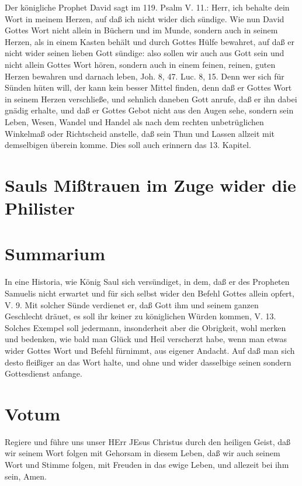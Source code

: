 Der königliche Prophet David sagt im 119. Psalm V. 11.: Herr, ich behalte dein Wort in meinem Herzen, auf daß ich nicht wider dich sündige. Wie nun David Gottes Wort nicht allein in Büchern und im Munde, sondern auch in seinem Herzen, als in einem Kasten behält und durch Gottes Hülfe bewahret, auf daß er nicht wider seinen lieben Gott sündige: also sollen wir auch aus Gott sein und nicht allein Gottes Wort hören, sondern auch in einem feinen, reinen, guten Herzen bewahren und darnach leben, Joh. 8, 47. Luc. 8, 15. Denn wer sich für Sünden hüten will, der kann kein besser Mittel finden, denn daß er Gottes Wort in seinem Herzen verschließe, und sehnlich daneben Gott anrufe, daß er ihn dabei gnädig erhalte, und daß er Gottes Gebot nicht aus den Augen sehe, sondern sein Leben, Wesen, Wandel und Handel als nach dem rechten unbetrüglichen Winkelmaß oder Richtscheid anstelle, daß sein Thun und Lassen allzeit mit demselbigen überein komme. Dies soll auch erinnern das 13. Kapitel.

\section{Sauls Mißtrauen im Zuge wider die Philister}

\section{Summarium}

In eine Historia, wie König Saul sich versündiget, in dem, daß er des Propheten Samuelis nicht erwartet und für sich selbst wider den Befehl Gottes allein opfert, V. 9. Mit solcher Sünde verdienet er, daß Gott ihm und seinem ganzen Geschlecht dräuet, es soll ihr keiner zu königlichen Würden kommen, V. 13. Solches Exempel soll jedermann, insonderheit aber die Obrigkeit, wohl merken und bedenken, wie bald man Glück und Heil verscherzt habe, wenn man etwas wider Gottes Wort und Befehl fürnimmt, aus eigener Andacht. Auf daß man sich desto fleißiger an das Wort halte, und ohne und wider dasselbige seinen sondern Gottesdienst anfange.

\section{Votum}

Regiere und führe uns unser HErr JEsus Christus durch den heiligen Geist, daß wir seinem Wort folgen mit Gehorsam in diesem Leben, daß wir auch seinem Wort und Stimme folgen, mit Freuden in das ewige Leben, und allezeit bei ihm sein, Amen.

